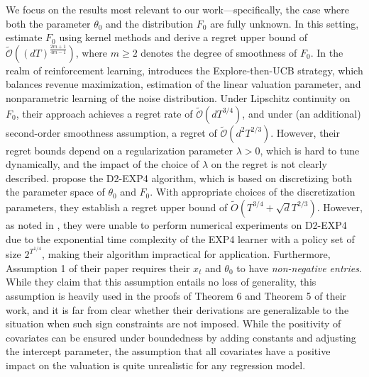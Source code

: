 We focus on the results most relevant to our 
work—specifically, the case where both the parameter $\theta_0$ and the distribution $F_0$ are fully unknown. In this setting, \cite{fan2021policy} estimate $F_0$ using kernel methods and derive a regret upper bound of $\widetilde{\mathcal{O}}((dT)^{\frac{2m+1}{4m-1}})$, where $m \geq 2$ denotes the degree of smoothness of $F_0$. In the realm of reinforcement learning, \cite{luo2022contextual} introduces the Explore-then-UCB strategy, which balances revenue maximization, estimation of the linear valuation parameter, and nonparametric learning of the noise distribution. Under Lipschitz continuity on $F_0$, their approach achieves a regret rate of $\widetilde{\mathcal{O}}(d T^{3/4})$, and under (an additional) second-order smoothness assumption, a regret of $\widetilde{\mathcal{O}}(d^2T^{2/3})$. However, their regret bounds depend on a regularization parameter $\lambda > 0$, which is hard to tune dynamically, and the impact of the choice of $\lambda$ on the regret is not clearly described. \cite{xu2022towards} propose the D2-EXP4 algorithm, which is based on discretizing both the parameter space of $\theta_0$ and $F_0$. With appropriate choices of the discretization parameters, they establish a regret upper bound of $\widetilde{O}(T^{3/4} +\sqrt{d} T^{2/3})$. However, as noted in \citet[Section 6]{xu2022towards}, they were unable to perform numerical experiments on D2-EXP4 due to the exponential time complexity of the EXP4 learner with a policy set of size $2^{T^{1/4}}$, making their algorithm impractical for application. 
Furthermore, Assumption 1 of their paper requires their $x_t$ and $\theta_0$ to have \emph{non-negative entries}. While they claim that this assumption entails no loss of generality, this assumption is heavily used in the proofs of Theorem 6 and Theorem 5 of their work, and it is far from clear whether their derivations are generalizable to the situation when such sign constraints are not imposed. While the positivity of covariates can be ensured under boundedness by adding constants and adjusting the intercept parameter, the assumption that all covariates have a positive impact on the valuation is quite unrealistic for any regression model. 
 
